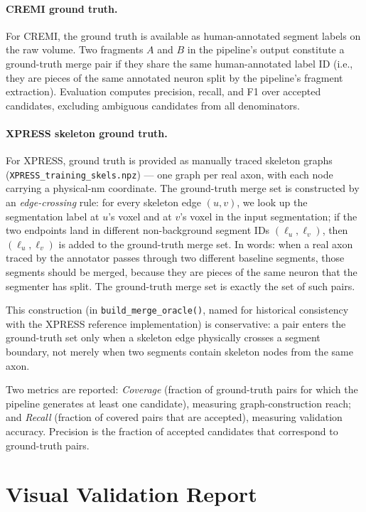 \paragraph{CREMI ground truth.}
For CREMI, the ground truth is available as human-annotated segment labels
on the raw volume. Two fragments $A$ and $B$ in the pipeline's output
constitute a ground-truth merge pair if they share the same human-annotated
label ID (i.e., they are pieces of the same annotated neuron split by the
pipeline's fragment extraction). Evaluation computes precision, recall, and
F1 over accepted candidates, excluding ambiguous candidates from all
denominators.

\paragraph{XPRESS skeleton ground truth.}
For XPRESS, ground truth is provided as manually traced skeleton graphs
(\texttt{XPRESS\_training\_skels.npz}) --- one graph per real axon, with each
node carrying a physical-nm coordinate. The ground-truth merge set is
constructed by an \emph{edge-crossing} rule: for every skeleton edge $(u, v)$,
we look up the segmentation label at $u$'s voxel and at $v$'s voxel in the
input segmentation; if the two endpoints land in different non-background
segment IDs $(\ell_u, \ell_v)$, then $(\ell_u, \ell_v)$ is added to the
ground-truth merge set. In words: when a real axon traced by the annotator
passes through two different baseline segments, those segments should be
merged, because they are pieces of the same neuron that the segmenter has
split. The ground-truth merge set is exactly the set of such pairs.

This construction (in \texttt{build\_merge\_oracle()}, named for historical
consistency with the XPRESS reference implementation) is conservative:
a pair enters the ground-truth set only when a skeleton edge physically
crosses a segment boundary, not merely when two segments contain skeleton
nodes from the same axon.

Two metrics are reported: \emph{Coverage} (fraction of ground-truth pairs for
which the pipeline generates at least one candidate), measuring
graph-construction reach; and \emph{Recall} (fraction of covered pairs that
are accepted), measuring validation accuracy. Precision is the fraction of
accepted candidates that correspond to ground-truth pairs.

\section{Visual Validation Report}
\label{sec:visual-validation}

